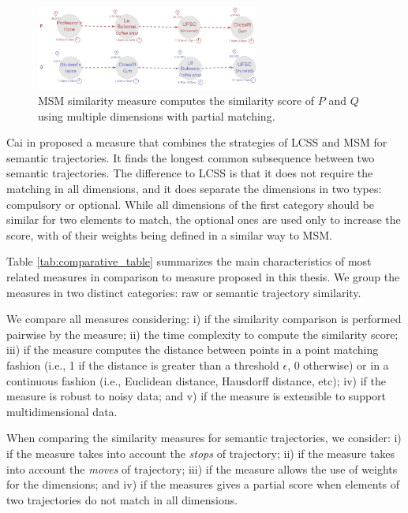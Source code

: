 \documentclass[12pt]{article}
\begin{document}
\begin{figure}[h]
\centering
\includegraphics[width=0.65\textwidth]{Related_Works/Semantic_Trajectories_(MSM).jpg}
\caption{\label{fig:related_trajes_MSM}MSM similarity measure computes the similarity score of $P$ and $Q$ using multiple dimensions with partial matching.}
\end{figure}


Cai in \cite{CaiLee2016} proposed a measure that combines the strategies of LCSS \cite{vlachos2002discovering} and MSM\cite{Furtado:TGIS12156} for semantic trajectories. It finds the longest common subsequence between two semantic trajectories. The difference to LCSS is that it does not require the matching in all dimensions, and it does separate the dimensions in two types: compulsory or optional. While all dimensions of the first category should be similar for two elements to match, the optional ones are used only to increase the score, with of their weights being defined in a similar way to MSM.

{Table {\ref{tab:comparative_table}} summarizes the main characteristics of most related measures in comparison to measure proposed in this thesis. We group the measures in two distinct categories: raw or semantic trajectory similarity.

We compare all measures considering: i) if the similarity comparison is performed pairwise by the measure; ii) the time complexity to compute the similarity score; iii) if the measure computes the distance between points in a point matching fashion (i.e., 1 if the distance is greater than a threshold $\epsilon$, 0 otherwise)  or in a continuous fashion (i.e., Euclidean distance, Hausdorff distance, etc); iv) if the measure is robust to noisy data; and v) if the measure is extensible to support multidimensional data.

When comparing the similarity measures for semantic trajectories, we consider: i) if the measure takes into account the \emph{stops} of trajectory; ii) if the measure takes into account the \emph{moves} of trajectory; iii) if the measure allows the use of weights for the dimensions; and iv) if the measures gives a partial score when elements of two trajectories do not match in all dimensions.}
\end{document}
